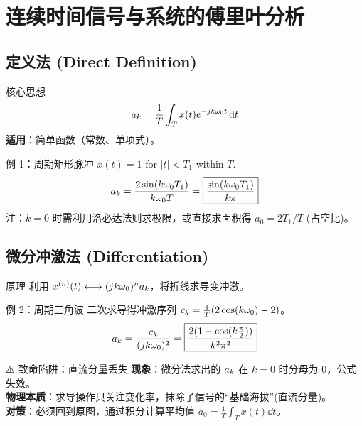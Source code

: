 \chapter{连续时间信号与系统的傅里叶分析}


\section{定义法 (Direct Definition)}
\begin{corebox}{核心思想}
    \[ a_k = \frac{1}{T} \int_{T} x(t) e^{-jk\omega_0 t} \,\mathrm{d} t \]
    \textbf{适用}：简单函数（常数、单项式）。
\end{corebox}

\begin{examplebox}{例 1：周期矩形脉冲}
    $x(t)=1$ for $|t|<T_1$ within $T$.
    \[ a_k = \frac{2\sin(k\omega_0 T_1)}{k\omega_0 T} = \boxed{\frac{\sin(k\omega_0 T_1)}{k\pi}} \]
    \small{注：$k=0$ 时需利用洛必达法则求极限，或直接求面积得 $a_0 = 2T_1/T$ (占空比)。}
\end{examplebox}

\section{微分冲激法 (Differentiation)}
\begin{corebox}{原理}
    利用 $x^{(n)}(t) \longleftrightarrow (jk\omega_0)^n a_k$，将折线求导变冲激。
\end{corebox}

\begin{examplebox}{例 2：周期三角波}
    二次求导得冲激序列 $c_k = \frac{1}{T}(2\cos(k\omega_0)-2)$。
    \[ a_k = \frac{c_k}{(jk\omega_0)^2} = \boxed{\frac{2(1-\cos(k\frac{\pi}{2}))}{k^2\pi^2}} \]
\end{examplebox}

\begin{alertbox}{⚠️ 致命陷阱：直流分量丢失}
    \textbf{现象}：微分法求出的 $a_k$ 在 $k=0$ 时分母为 0，公式失效。
    \\ \textbf{物理本质}：求导操作只关注变化率，抹除了信号的“基础海拔”(直流分量)。
    \\ \textbf{对策}：必须回到原图，通过积分计算平均值 $\displaystyle a_0 = \frac{1}{T} \int_T x(t) \dd t$。
\end{alertbox}


